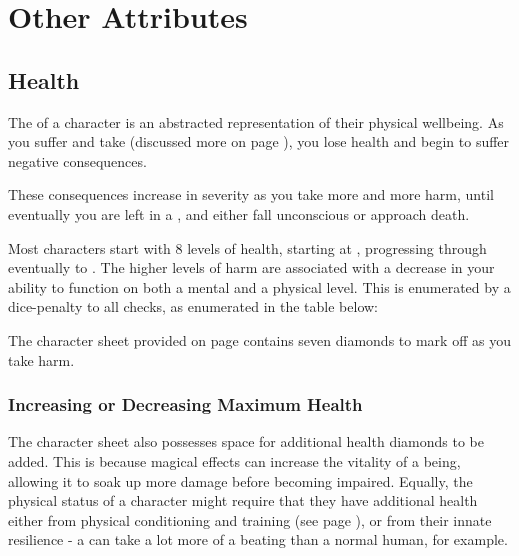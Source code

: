 \chapter{Other Attributes}




\section{Health}\label{S:Health}

The  of a character is an abstracted representation of their physical wellbeing. As you suffer  and take  (discussed more on page \pageref{S:Damage}), you lose health and begin to suffer negative consequences. 

These consequences increase in severity as you take more and more harm, until eventually you are left in a , and either fall unconscious or approach death. 

Most characters start with 8 levels of health, starting at , progressing through  eventually to . The higher levels of harm are associated with a decrease in your ability to function on both a mental and a physical level. This is enumerated by a dice-penalty to all checks, as enumerated in the table below:


The character sheet provided on page \pageref{S:CharacterSheet} contains seven diamonds to mark off as you take harm. 


\subsection{Increasing or Decreasing Maximum Health}

The character sheet also possesses space for additional health diamonds to be added. This is because magical effects can increase the vitality of a being, allowing it to soak up more damage before becoming impaired. Equally, the physical status of a character might require that they have additional health either from physical conditioning and training (see page \pageref{S:Progression}), or from their innate resilience - a  can take a lot more of a beating than a normal human, for example. 


